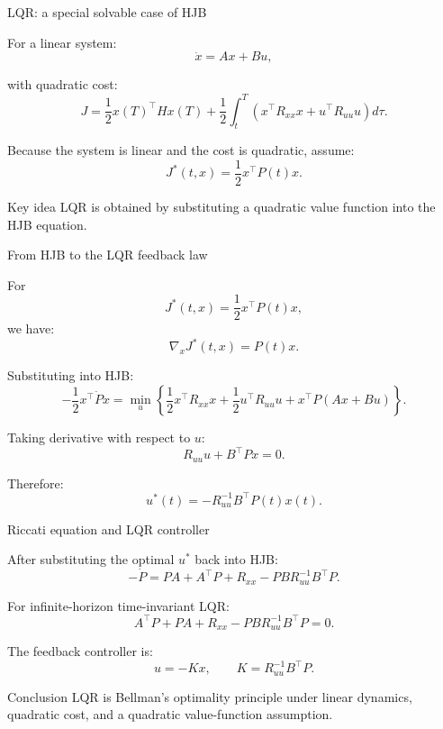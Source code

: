 \documentclass[aspectratio=169]{beamer}
\begin{document}
\begin{frame}{LQR: a special solvable case of HJB}

For a linear system:
\[
\dot{x}=Ax+Bu,
\]

with quadratic cost:
\[
J
=
\frac12 x(T)^\top Hx(T)
+
\frac12
\int_t^T
\left(
x^\top R_{xx}x
+
u^\top R_{uu}u
\right)d\tau .
\]

\vspace{0.2cm}

Because the system is linear and the cost is quadratic, assume:
\[
J^*(t,x)=\frac12 x^\top P(t)x .
\]

\vspace{0.2cm}

\begin{block}{Key idea}
\small
LQR is obtained by substituting a quadratic value function into the HJB equation.
\end{block}

\end{frame}


\begin{frame}{From HJB to the LQR feedback law}

For
\[
J^*(t,x)=\frac12x^\top P(t)x,
\]
we have:
\[
\nabla_xJ^*(t,x)=P(t)x .
\]


Substituting into HJB:
\[
-\frac12x^\top\dot P x
=
\min_u
\left\{
\frac12x^\top R_{xx}x
+
\frac12u^\top R_{uu}u
+
x^\top P(Ax+Bu)
\right\}.
\]



Taking derivative with respect to $u$:
\[
R_{uu}u+B^\top Px=0.
\]

Therefore:
\[
u^*(t)=-R_{uu}^{-1}B^\top P(t)x(t).
\]

\end{frame}


\begin{frame}{Riccati equation and LQR controller}

After substituting the optimal $u^*$ back into HJB:
\[
-\dot P
=
PA+A^\top P+R_{xx}
-
PBR_{uu}^{-1}B^\top P .
\]

\vspace{0.2cm}

For infinite-horizon time-invariant LQR:
\[
A^\top P+PA+R_{xx}
-
PBR_{uu}^{-1}B^\top P=0.
\]

\vspace{0.2cm}

The feedback controller is:
\[
u=-Kx,
\qquad
K=R_{uu}^{-1}B^\top P.
\]

\vspace{0.2cm}

\begin{block}{Conclusion}
\small
LQR is Bellman's optimality principle under linear dynamics, quadratic cost, and a quadratic value-function assumption.
\end{block}

\end{frame}
\end{document}
